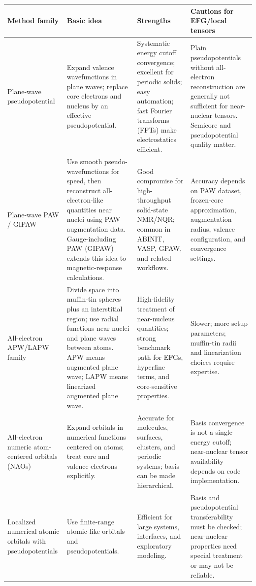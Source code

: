\documentclass[11pt]{article}
\begin{document}
\begin{longtable}{@{}L{0.21\textwidth}L{0.25\textwidth}L{0.24\textwidth}L{0.22\textwidth}@{}}
\toprule
\textbf{Method family} & \textbf{Basic idea} & \textbf{Strengths} & \textbf{Cautions for EFG/local tensors} \\
\midrule
\endhead
Plane-wave pseudopotential & Expand valence wavefunctions in plane waves; replace core electrons and nucleus by an effective pseudopotential. & Systematic energy cutoff convergence; excellent for periodic solids; easy automation; fast Fourier transforms (FFTs) make electrostatics efficient. & Plain pseudopotentials without all-electron reconstruction are generally not sufficient for near-nuclear tensors.  Semicore and pseudopotential quality matter. \\
Plane-wave PAW / GIPAW & Use smooth pseudo-wavefunctions for speed, then reconstruct all-electron-like quantities near nuclei using PAW augmentation data.  Gauge-including PAW (GIPAW) extends this idea to magnetic-response calculations. & Good compromise for high-throughput solid-state NMR/NQR; common in ABINIT, VASP, GPAW, and related workflows. & Accuracy depends on PAW dataset, frozen-core approximation, augmentation radius, valence configuration, and convergence settings. \\
All-electron APW/LAPW family & Divide space into muffin-tin spheres plus an interstitial region; use radial functions near nuclei and plane waves between atoms.  APW means augmented plane wave; LAPW means linearized augmented plane wave. & High-fidelity treatment of near-nucleus quantities; strong benchmark path for EFGs, hyperfine terms, and core-sensitive properties. & Slower; more setup parameters; muffin-tin radii and linearization choices require expertise. \\
All-electron numeric atom-centered orbitals (NAOs) & Expand orbitals in numerical functions centered on atoms; treat core and valence electrons explicitly. & Accurate for molecules, surfaces, clusters, and periodic systems; basis can be made hierarchical. & Basis convergence is not a single energy cutoff; near-nuclear tensor availability depends on code implementation. \\
Localized numerical atomic orbitals with pseudopotentials & Use finite-range atomic-like orbitals and pseudopotentials. & Efficient for large systems, interfaces, and exploratory modeling. & Basis and pseudopotential transferability must be checked; near-nuclear properties need special treatment or may not be reliable. \\

\end{longtable}
\end{document}
